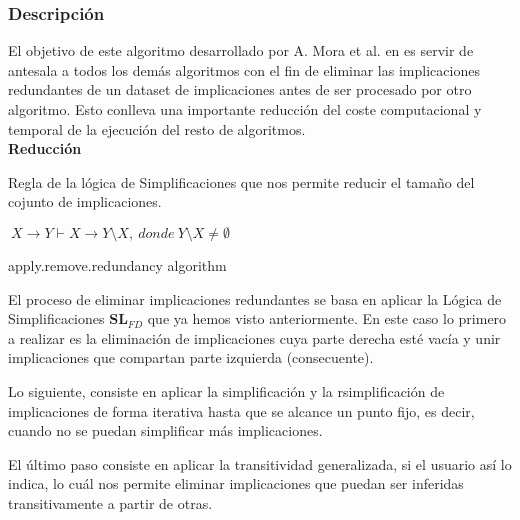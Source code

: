 \subsubsection{Descripci\'on} 

El objetivo de este algoritmo desarrollado por A. Mora et al. en \cite{Mora2003} es servir de antesala a todos los dem\'as algoritmos con el fin de eliminar las implicaciones redundantes de un dataset de implicaciones antes de ser procesado por otro algoritmo. Esto conlleva una importante reducci\'on del coste computacional y temporal de la ejecuci\'on del resto de algoritmos.\\

\textbf{Reducci\'on}

Regla de la l\'ogica de Simplificaciones que nos permite reducir el tama\~no del cojunto de implicaciones.

\begin{center}
    \(\ X \to Y \vdash X \to Y \setminus X, \ donde \ Y \setminus X \neq \emptyset \)
\end{center}

\IncMargin{1em}
\begin{algorithm}[H]
    \SetAlgoLined
    \LinesNumbered
    \DontPrintSemicolon
    \caption{apply.remove.redundancy algorithm}\label{alg:1}
\end{algorithm}\DecMargin{1em}
\bigskip
El proceso de eliminar implicaciones redundantes se basa en aplicar la L\'ogica de Simplificaciones \(\textbf{SL}_{FD}\) que ya hemos visto anteriormente. En este caso lo primero a realizar es la eliminaci\'on de implicaciones cuya parte derecha est\'e vac\'ia y unir implicaciones que compartan parte izquierda (consecuente).

Lo siguiente, consiste en aplicar la simplificaci\'on y la rsimplificaci\'on de implicaciones de forma iterativa hasta que se alcance un punto fijo, es decir, cuando no se puedan simplificar m\'as implicaciones.

El \'ultimo paso consiste en aplicar la transitividad generalizada, si el usuario as\'i lo indica, lo cu\'al nos permite eliminar implicaciones que puedan ser inferidas transitivamente a partir de otras.

